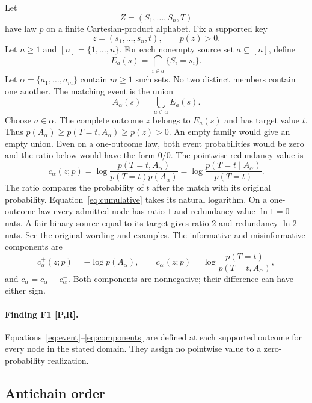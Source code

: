 \documentclass[11pt]{article}
\newcommand{\evidence}[1]{\textbf{[#1]}}
\begin{document}
Let
\[
Z=(S_1,\ldots,S_n,T)
\]
have law $p$ on a finite Cartesian-product alphabet.  Fix a supported key
\[
z=(s_1,\ldots,s_n,t),\qquad p(z)>0.
\]
Let $n\geq1$ and $[n]=\{1,\ldots,n\}$. For each nonempty source set $a\subseteq[n]$, define
\[
E_a(s)=\bigcap_{i\in a}\{S_i=s_i\}.
\]
Let $\alpha=\{a_1,\ldots,a_m\}$ contain $m\geq1$ such sets. No two distinct members contain one another. The matching event is the union
\begin{equation}
A_\alpha(s)=\bigcup_{a\in\alpha}E_a(s).
\label{eq:event}
\end{equation}
Choose $a\in\alpha$. The complete outcome $z$ belongs to $E_a(s)$ and has target value $t$. Thus $p(A_\alpha)\geq p(T=t,A_\alpha)\geq p(z)>0$.
An empty family would give an empty union. Even on a one-outcome law, both event probabilities would be zero and the ratio below would have the form $0/0$. The pointwise redundancy value is
\begin{equation}
c_\alpha(z;p)
=\log\frac{p(T=t,A_\alpha)}{p(T=t)p(A_\alpha)}
=\log\frac{p(T=t\mid A_\alpha)}{p(T=t)}.
\label{eq:cumulative}
\end{equation}
The ratio compares the probability of $t$ after the match with its original probability. Equation~\eqref{eq:cumulative} takes its natural logarithm. On a one-outcome law every admitted node has ratio $1$ and redundancy value $\ln 1=0$ nats. A fair binary source equal to its target gives ratio $2$ and redundancy $\ln 2$ nats. See the \href{https://github.com/sepahead/pid-rs/blob/main/audit/evidence/finite-sx-node-and-logarithm-2026-11-21.md}{original wording and examples}.
The informative and misinformative components are
\begin{equation}
c_\alpha^+(z;p)=-\log p(A_\alpha),
\qquad
c_\alpha^-(z;p)=\log\frac{p(T=t)}{p(T=t,A_\alpha)},
\label{eq:components}
\end{equation}
and $c_\alpha=c_\alpha^+-c_\alpha^-$.  Both components are nonnegative;
their difference can have either sign.

\paragraph{Finding F1 \evidence{P,R}.}
Equations~\eqref{eq:event}--\eqref{eq:components} are defined at each supported outcome for every node in the stated domain.  They assign no pointwise value to a zero-probability
realization.

\subsection{Antichain order}
\end{document}
